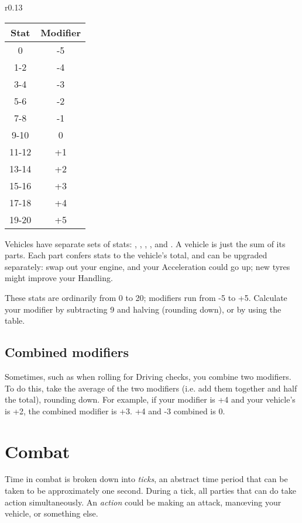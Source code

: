 \documentclass[10pt, a4paper, twocolumn]{article}
\begin{document}
\begin{wraptable}[12]{r}{0.13\textwidth}
\vspace*{-3ex}
\hspace*{-3ex}
\begin{tabular}{cc}
  Stat  & Modifier \\
  \hline 
  0     & -5       \\
  1-2   & -4       \\
  3-4   & -3       \\
  5-6   & -2       \\
  7-8   & -1       \\
  9-10  &  0       \\
  11-12 & +1       \\
  13-14 & +2       \\
  15-16 & +3       \\
  17-18 & +4       \\
  19-20 & +5
\end{tabular}
\end{wraptable}

Vehicles have separate sets of stats: , ,
, ,  and . A vehicle is just
the sum of its parts. Each part confers stats to the vehicle's total, and can be
upgraded separately: swap out your engine, and your Acceleration could go up;
new tyres might improve your Handling.

These stats are ordinarily from 0 to 20; modifiers
run from -5 to +5. Calculate your modifier by subtracting 9 and halving
(rounding down), or by using the table.

\subsection{Combined modifiers}
Sometimes, such as when rolling for Driving checks, you combine two
modifiers. To do this, take the average of the two modifiers (i.e. add them
together and half the total), rounding down. For example, if your 
modifier is +4 and your vehicle's  is +2, the combined modifier
is +3. +4 and -3 combined is 0. 

\section{Combat}

Time in combat is broken down into \emph{ticks}, an abstract time period that
can be taken to be approximately one second. During a tick, all parties that
can do take action simultaneously. An \emph{action} could be making an attack,
man\oe{}ving your vehicle, or something else.
\end{document}
